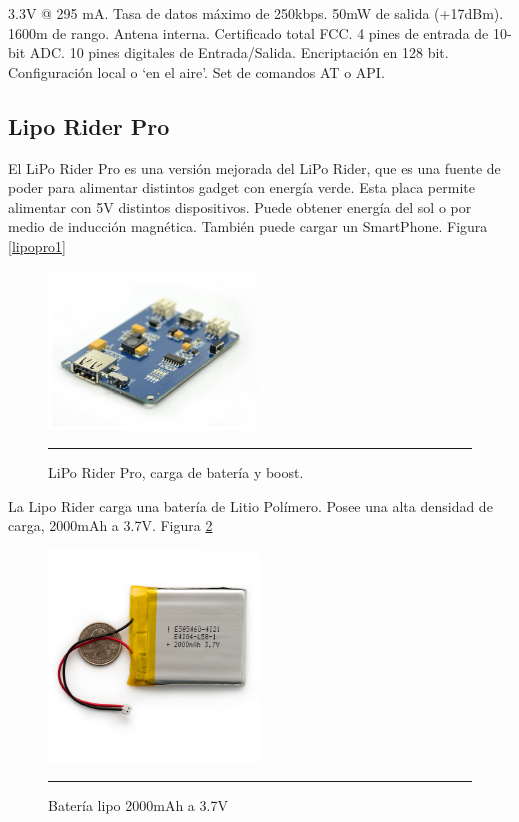 3.3V @ 295 mA.
Tasa de datos máximo de 250kbps.
50mW de salida (+17dBm).
1600m de rango.
Antena interna.
Certificado total FCC.
4 pines de entrada de 10-bit ADC.
10 pines digitales de Entrada/Salida.
Encriptación en 128 bit.
Configuración local o ‘en el aire’.
Set de comandos AT o API.




\subsection{Lipo Rider Pro}

El LiPo Rider Pro es una versión mejorada del LiPo Rider, que es una fuente de poder para alimentar distintos gadget con energía verde. Esta placa permite alimentar con 5V distintos dispositivos. Puede obtener energía del sol o por medio de inducción magnética. También puede cargar un SmartPhone. Figura \ref{lipopro1}
\newpage

\begin{figure}[htbp]
	\centering
		\includegraphics[width=0.5\textwidth]{./Figures/MODI/lipopro.jpg}
		\rule{35em}{0.5pt}
	\caption[lipopro1]{LiPo Rider Pro, carga de batería y boost.}
	\label{fig:lipopro1}
\end{figure}

La Lipo Rider carga una batería de Litio Polímero. Posee una alta densidad de carga, 2000mAh a 3.7V. Figura \ref{fig:bateria}
\begin{figure}[htbp]
	\centering
		\includegraphics[width=0.5\textwidth]{./Figures/MODI/bateria.jpg}
		\rule{35em}{0.5pt}
	\caption[Bateria]{Batería lipo 2000mAh a 3.7V}
	\label{fig:bateria}
\end{figure}


